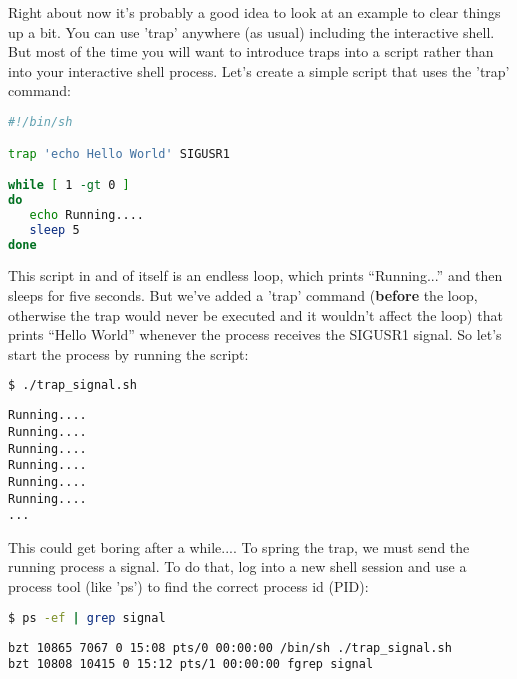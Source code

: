 Right about now it's probably a good idea to look at an example to clear things
up a bit. You can use 'trap' anywhere (as usual) including the interactive
shell. But most of the time you will want to introduce traps into a script
rather than into your interactive shell process. Let's create a simple script
that uses the 'trap' command:


\lstset{basicstyle=\scriptsize, numbers=left, captionpos=b, tabsize=4}
\begin{lstlisting}[caption=A simple signal trap,language={bash},
breaklines=true,xleftmargin=15pt,label=lst:A simple signal trap]
#!/bin/sh

trap 'echo Hello World' SIGUSR1

while [ 1 -gt 0 ]
do
   echo Running....
   sleep 5
done
\end{lstlisting}

This script in and of itself is an endless loop, which prints ``Running...''
and then sleeps for five seconds. But we've added a 'trap' command
(\textbf{before} the loop, otherwise the trap would never be executed and it
wouldn't affect the loop) that prints ``Hello World'' whenever the process
receives the SIGUSR1 signal. So let's start the process by running the script:

\lstset{basicstyle=\scriptsize, numbers=left, captionpos=b, tabsize=4}
\begin{lstlisting}[caption=Infinite loop...,language={bash},
breaklines=true,xleftmargin=15pt,label=lst:Infinite loop...]
$ ./trap_signal.sh
\end{lstlisting}

\scriptsize
\begin{verbatim}
Running....
Running....
Running....
Running....
Running....
Running....
...
\end{verbatim}
\normalsize

This could get boring after a while....
To spring the trap, we must send the running process a signal. To do that, log
into a new shell session and use a process tool (like 'ps') to find the correct
process id (PID):

\lstset{basicstyle=\scriptsize, numbers=left, captionpos=b, tabsize=4}
\begin{lstlisting}[caption=Finding the process ID,language={bash},
breaklines=true,xleftmargin=15pt,label=lst:Finding the process ID]
$ ps -ef | grep signal
\end{lstlisting}

\scriptsize
\begin{verbatim}
bzt 10865 7067 0 15:08 pts/0 00:00:00 /bin/sh ./trap_signal.sh
bzt 10808 10415 0 15:12 pts/1 00:00:00 fgrep signal
\end{verbatim}
\normalsize

